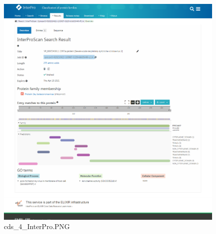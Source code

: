 \documentclass[supercite]{HustGraduPaper}
\begin{document}
	\begin{figure}[H]
		\centering
		\includegraphics[width=1\textwidth]{./material/practice2/cds_4/InterPro.png}
		\caption{cds\_4\_InterPro.PNG}
	\end{figure}
\end{document}
